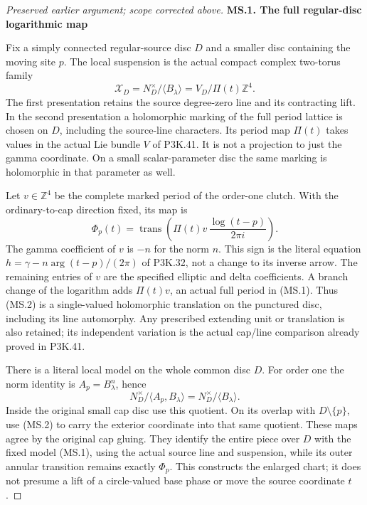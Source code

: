 \begin{proof}[Preserved earlier argument; scope corrected above]
\par

\medskip\noindent\textbf{MS.1. The full regular-disc logarithmic map}

\par\nobreak

Fix a simply connected regular-source disc \(D\) and a smaller disc
containing the moving site \(p\). The local suspension is the actual
compact complex two-torus family
\[
 \mathcal X_D=N_D^\times/\langle B_\lambda\rangle
       =V_D/\Pi(t)\mathbb Z^4.                         \tag{MS.1}
\]
The first presentation retains the source degree-zero line and its
contracting lift. In the second presentation a holomorphic marking of
the full period lattice is chosen on \(D\), including the source-line
characters. Its period map \(\Pi(t)\) takes values in the actual Lie
bundle \(V\) of P3K.41. It is not a projection to just the gamma
coordinate. On a small scalar-parameter disc the same marking is
holomorphic in that parameter as well.

Let \(v\in\mathbb Z^4\) be the complete marked period of the
order-one clutch. With the ordinary-to-cap direction fixed, its map is
\[
 \Phi_p(t)=\operatorname{trans}\left(
       \Pi(t)v\,\frac{\log(t-p)}{2\pi i}\right).        \tag{MS.2}
\]
The gamma coefficient of \(v\) is \(-n\) for the norm \(n\).
This sign is the literal equation
\(h=\gamma-n\arg(t-p)/(2\pi)\) of P3K.32, not a change to its
inverse arrow. The remaining entries of \(v\) are the specified
elliptic and delta coefficients. A branch change of the logarithm adds
\(\Pi(t)v\), an actual full period in (MS.1). Thus (MS.2) is a
single-valued holomorphic translation on the punctured disc, including
its line automorphy. Any prescribed extending unit or translation is
also retained; its independent variation is the actual cap/line
comparison already proved in P3K.41.

There is a literal local model on the whole common disc \(D\).
For order one the norm identity is \(A_p=B_\lambda^n\), hence
\[
 N_D^\times/\langle A_p,B_\lambda\rangle
              =N_D^\times/\langle B_\lambda\rangle .    \tag{MS.3}
\]
Inside the original small cap disc use this quotient. On its overlap
with \(D\setminus\{p\}\), use (MS.2) to carry the exterior
coordinate into that same quotient. These maps agree by the original
cap gluing. They identify the entire piece over \(D\) with the
fixed model (MS.1), using the actual source line and suspension, while
its outer annular transition remains exactly \(\Phi_p\). This
constructs the enlarged chart; it does not presume a lift of a
circle-valued base phase or move the source coordinate \(t\).


\end{proof}
